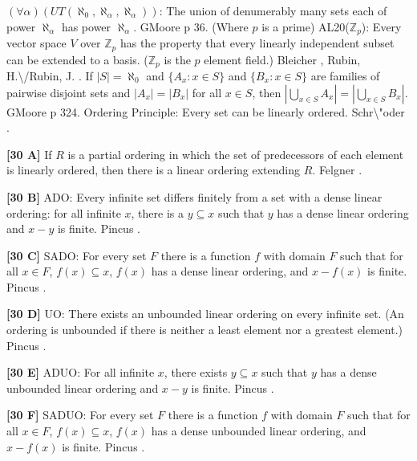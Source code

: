 \medskip
{} $(\forall \alpha)( UT(\aleph_{0},\aleph_{\alpha},
\aleph_{\alpha}))$: The  union of denumerably many sets each of power
$\aleph_{\alpha }$ has power $\aleph_{\alpha}$. G\. \ac{Moore}
\cite{1982} p 36.
\medskip
{} (Where $p$ is a prime) AL20($\mathbb Z_p$):
Every vector space $V$ over $\mathbb Z_p$ has the property that every
linearly independent subset can be extended to a basis.  ($\mathbb Z_p$ is
the $p$ element field.) \ac{Bleicher} \cite{1964}, \ac{Rubin, H.\/Rubin,
J.} \cite{1985, p.119, AL20}.
\medskip
{} If $|S| = \aleph_{0}$ and $\{A_{x}: x\in S\}$ and
$\{B_{x}: x\in S\}$ are families of pairwise disjoint sets and $|A_{x}|
= |B_{x}|$ for all $x\in S$, then $|\bigcup^{}_{x\in S} A_{x}| =
|\bigcup^{}_{x\in S} B_{x}|$. G\. \ac{Moore} \cite{1982} p 324.
\medskip
{} Ordering Principle: Every set can be linearly
ordered.  \ac{Schr\"oder} \cite{1988}. 
\smallskip
\item{}{\bf [30 A]} If $R$ is a partial ordering in which the set of
predecessors of each element is linearly ordered, then there is
a linear ordering extending $R$.  \ac{Felgner} \cite{1969}.
\smallskip
\item{}{\bf [30 B]} ADO: Every infinite set differs finitely from a set
with a dense linear ordering: for all infinite $x$, there is a $y\subseteq
x$ such that $y$ has a dense linear ordering and $x-y$ is finite.
\ac{Pincus} \cite{1997}.
\smallskip
\item{}{\bf [30 C]} SADO: For every set $F$ there is a function $f$ with
domain $F$ such that for all $x\in F$, $f(x)\subseteq x$, $f(x)$ has
a dense linear ordering,  and $x - f(x)$ is finite. \ac{Pincus}
\cite{1997}.
\smallskip
\item{}{\bf [30 D]} UO: There exists an unbounded linear ordering
on every infinite set. (An ordering is unbounded if there is neither
a least element nor a greatest element.) \ac{Pincus} \cite{1997}.
\smallskip
\item{}{\bf [30 E]} ADUO: For all infinite $x$, there exists $y\subseteq
x$ such that $y$ has a dense unbounded linear ordering and $x - y$ is
finite. \ac{Pincus} \cite{1997}.
\smallskip
\item{}{\bf [30 F]} SADUO: For every set $F$ there is a function $f$ with
domain $F$ such that for all $x\in F$, $f(x)\subseteq x$, $f(x)$ has
a dense unbounded linear ordering, and $x - f(x)$ is finite. \ac{Pincus}
\cite{1997}.
\smallskip
